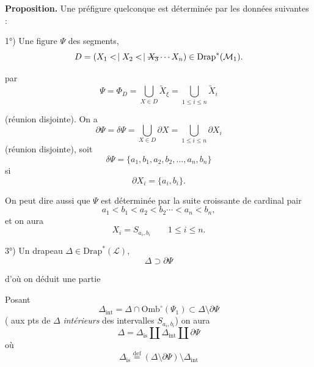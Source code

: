 \documentclass[11pt,a4paper]{article}
\begin{document}

\textbf{Proposition.} Une préfigure quelconque est déterminée par les données suivantes :

1°) Une figure $\Psi$   des  segments, 
\[
  D = (X_1 \mathrel{<\!|} X_2 \mathrel{<\!|} \text{\struck{$X_3$}} \cdots X_n) \in \mathrm{Drap}^*(\mathcal{M}_1) .
\]

  par
\[
  \Psi = \Phi_D = \bigcup_{X \in D} \widetilde{X}_{\xi} = \bigcup_{1 \leq i \leq n} \widetilde{X}_i
\]

(réunion disjointe). On a 
\[
  \partial\Psi = \delta\Psi = \bigcup_{X \in D} \partial X = \bigcup_{1 \leq i \leq n} \partial X_i
\]
(réunion disjointe), soit
\[
  \delta\Psi = \{a_1, b_1, a_2, b_2, \ldots, a_n, b_n\}
\]
si
\[
  \partial X_i = \{a_i, b_i\} .
\]

On peut dire aussi que $\Psi$ est déterminée par la suite  croissante de cardinal pair
\[
  a_1 < b_1 < a_2 < b_2 \cdots < a_n < b_n ,
\]
et on aura
\[
  X_i = S_{a_i, b_i} \qquad 1 \leq i \leq n .
\]


3°) Un drapeau $\Delta \in \mathrm{Drap}^*(\mathcal{L})$,
\[
  \Delta \supset \partial\Psi
\]


d'où on déduit une partie



Posant
\[
  \Delta_{\mathrm{int}} = \Delta \cap \mathrm{Omb}^\circ(\Psi_1) \subset \Delta \setminus \partial\Psi
\]
( aux pts de $\Delta$ \emph{intérieurs} \struck{\ill{}} \add{\ill{}} des intervalles $S_{a_i, b_i}$) on aura
\[
  \Delta = \Delta_{\mathrm{is}} \amalg \Delta_{\mathrm{int}} \amalg \partial\Psi
\]
où
\[
  \Delta_{\mathrm{is}} \overset{\mathrm{def}}{=} (\Delta \setminus \partial\Psi) \setminus \Delta_{\mathrm{int}}
\]
\end{document}

